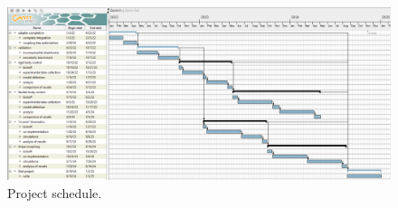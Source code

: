 \begin{landscape}

\begin{figure}
\centering
\includegraphics[width=1.6\textwidth]{images/Gantt_PhD.PNG}
\caption{Project schedule.}
\label{fig:sched}
\end{figure}

\end{landscape}

